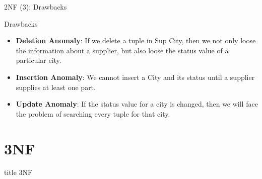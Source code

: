 \documentclass[aspectratio=169, xcolor=dvipsnames]{beamer}
\begin{document}
\begin{frame}{2NF (3): Drawbacks}
    \begin{alertblock}{Drawbacks}
        \begin{itemize}[<+->]
            \item \textbf{Deletion Anomaly}: If we delete a tuple in Sup City, then we not only loose the information about a supplier, but also loose the status value of a particular city.
            \item \textbf{Insertion Anomaly}: We cannot insert a City and its status until a supplier supplies at least one part.
            \item \textbf{Update Anomaly}: If the status value for a city is changed, then we will face the problem of searching every tuple for that city.
        \end{itemize}
    \end{alertblock}
\end{frame}

\section{3NF}
\begin{frame}
  \vfill
  \centering
  \begin{beamercolorbox}[sep=8pt,center,shadow=true,rounded=true]{title}
    3NF\par%
  \end{beamercolorbox}
  \vfill
\end{frame}
\end{document}
